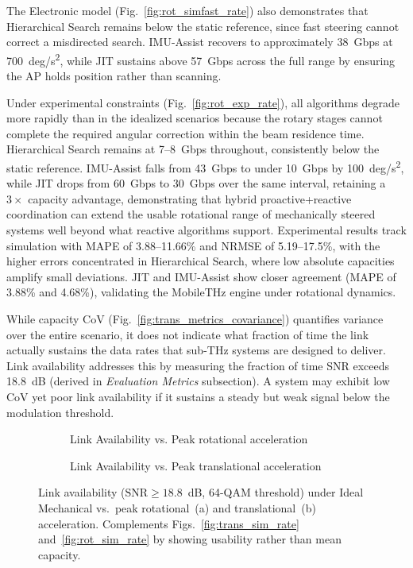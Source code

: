 \documentclass[fleqn,10pt]{wlscirep}
\newcommand{\rev}[1]{{\color{revblue}#1}}
\begin{document}
The Electronic model (Fig.~\ref{fig:rot_simfast_rate}) also demonstrates that Hierarchical Search remains below the static reference, since fast steering cannot correct a misdirected search. IMU-Assist \rev{recovers to approximately} \SI{38}{Gbps} at \SI{700}{deg/s^2}, while JIT sustains above \SI{57}{Gbps} across the full range by ensuring the AP holds position rather than scanning.

Under experimental constraints (Fig.~\ref{fig:rot_exp_rate}), all algorithms degrade more rapidly than in the idealized scenarios because the rotary stages cannot complete the required angular correction within the beam residence time. Hierarchical Search remains at \SI{7}{}--\SI{8}{Gbps} throughout, consistently below the static reference. IMU-Assist falls from \SI{43}{Gbps} to under \SI{10}{Gbps} by \SI{100}{deg/s^2}, while JIT drops from \SI{60}{Gbps} to \SI{30}{Gbps} over the same interval, retaining a $3\times$ capacity advantage, demonstrating that hybrid proactive+reactive coordination can extend the usable rotational range of mechanically steered systems well beyond what reactive algorithms support. Experimental results track simulation with MAPE of 3.88--11.66\% and NRMSE of 5.19--17.5\%, with the higher errors concentrated in Hierarchical Search, where low absolute capacities amplify small deviations. JIT and IMU-Assist show closer agreement (MAPE of 3.88\% and 4.68\%), validating the MobileTHz engine under rotational dynamics.

While capacity CoV (Fig.~\ref{fig:trans_metrics_covariance}) quantifies variance over the entire scenario, it does not indicate what fraction of time the link actually sustains the data rates that sub-THz systems are designed to deliver\cite{Dang2020, Nokia2022}. Link availability addresses this by measuring the fraction of time SNR exceeds \SI{18.8}{dB} (derived in \textit{Evaluation Metrics} subsection). A system may exhibit low CoV yet poor link availability if it sustains a steady but weak signal below the modulation threshold.

\begin{figure}[h!]
    \centering
    \begin{subfigure}{0.495\linewidth}
        
        \vspace{-25pt}
        \caption{Link Availability vs. Peak rotational acceleration}
        \label{fig:rotionalLinkAvail}
    \end{subfigure}
    \hfill
    \begin{subfigure}{0.495\linewidth}
        
        \vspace{-25pt}
        \caption{Link Availability vs. Peak translational acceleration}
        \label{fig:translationalLinkAvail}
    \end{subfigure}
    \caption{Link availability ($\mathrm{SNR} \geq 18.8$~dB, 64-QAM threshold) under Ideal Mechanical vs.\ peak rotational~(a) and translational~(b) acceleration. Complements Figs.~\ref{fig:trans_sim_rate} and~\ref{fig:rot_sim_rate} by showing usability rather than mean capacity.}
    \label{fig:accelLinkAvail}
    \vspace{-5pt}
\end{figure}
\end{document}
